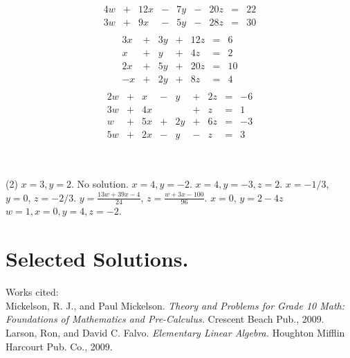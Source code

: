 \documentclass[12pt,fleqn]{book}
\newcommand{\sol}[1]{\begin{Answer}#1\end{Answer}}
\begin{document}
{\begin{tasks}
		\task \vspace{-2.3em}
		\begin{align*}
			\begin{array}{rrrrrrrrr}
				4w & + & 12x & - & 7y & - & 20z & = & 22 \\
				3w & + & 9x  & - & 5y & - & 28z & = & 30
			\end{array}
		\end{align*}
		\clearpage
		\task \vspace{-2.3em}
		\begin{align*}
			\begin{array}{rrrrrrr}
				3x & + & 3y & + & 12z & = & 6  \\
				x  & + & y  & + & 4z  & = & 2  \\
				2x & + & 5y & + & 20z & = & 10 \\
				-x & + & 2y & + & 8z  & = & 4
			\end{array}
		\end{align*}
		\task \vspace{-2.3em}
		\begin{align*}
			\begin{array}{rrrrrrrrr}
				2w & + & x  & - & y  & + & 2z & = & -6 \\
				3w & + & 4x &   &    & + & z  & = & 1  \\
				w  & + & 5x & + & 2y & + & 6z & = & -3 \\
				5w & + & 2x & - & y  & - & z  & = & 3
			\end{array}
		\end{align*}
	\end{tasks}
}
\clearpage
\
\newpage
\sol{
	\begin{tasks}(2)
		\task $x=3,y=2$.
		\task No solution.
		\task $x=4,y=-2$.
		\task $x=4,y=-3,z=2$.
		\task $x=-1/3$, $y=0$, $z=-2/3$.
		\task $y=\frac{13w+39x-4}{24}$, $z=\frac{w+3x-100}{96}$.
		\task $x=0$, $y=2-4z$
		\task $w=1,x=0,y=4,z=-2$.
	\end{tasks}
}
\chapter{Selected Solutions.}
\shipoutAnswer
\clearpage
Works cited:
\\[1em]
Mickelson, R. J., and Paul Mickelson. \emph{Theory and Problems for Grade 10 Math: Foundations of Mathematics and Pre-Calculus.} Crescent Beach Pub., 2009.
\\[1em]
Larson, Ron, and David C. Falvo. \emph{Elementary Linear Algebra.} Houghton Mifflin Harcourt Pub. Co., 2009.
\end{document}
